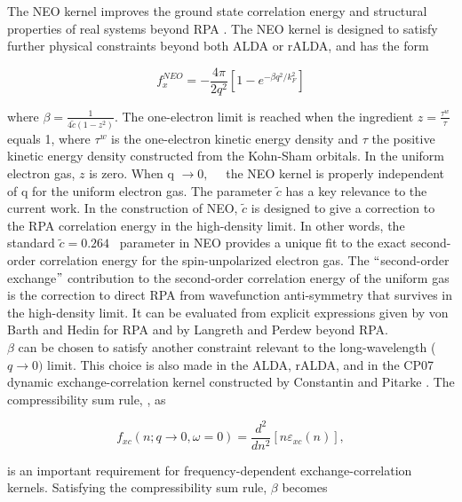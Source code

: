 \documentclass[aps,amsmath,amssymb, preprint, 12pt]{revtex4-1}
\begin{document}
The NEO kernel improves the ground state correlation energy and structural properties of real systems beyond RPA \cite{BLR16}. The NEO kernel is designed to satisfy further physical constraints beyond both ALDA or rALDA, and has the form

\begin{equation}
f_{x}^{NEO}=-\frac{4 \pi }{2q^{2}} [ 1-e^{- \beta q^{2}/k_{F}^{2}} ]
\end{equation}

where  \(  \beta =\frac{1}{4\widetilde{c} \left( 1-z^{2} \right) }. \)   The one-electron limit is reached when the ingredient  \( z=\frac{ \tau^{w}}{ \tau} \) equals 1, where  \(  \tau^{w} \)  is the one-electron kinetic energy density \cite{W35} and  \(  \tau \)  the positive kinetic energy density constructed from the Kohn-Sham orbitals. In the uniform electron gas,  \( z \)  is zero. When q \(  \rightarrow 0, \) \ \  the NEO kernel is properly independent of q for the uniform electron gas. The parameter  \( \widetilde{c} \)  has a key relevance to the current work. In the construction of NEO,  \( \widetilde{c} \)  is designed to give a correction to the RPA correlation energy in the high-density limit. In other words, the standard  \( \widetilde{c}=0.264 \) \ parameter in NEO provides a unique fit to the exact second-order correlation energy for the spin-unpolarized electron gas.  The $``$second-order exchange$"$  contribution to the second-order correlation energy of the uniform gas is the correction to direct RPA from wavefunction anti-symmetry that survives in the high-density limit. It can be evaluated from explicit expressions given by von Barth and Hedin for RPA \cite{VH72} and by Langreth and Perdew \cite{LP75}  beyond RPA.\\

 \noindent \(  \beta  \)  can be chosen to satisfy another constraint relevant to the long-wavelength ( \( q \rightarrow 0 )  \)  limit. This choice is also made in the ALDA, rALDA, and in the CP07 dynamic exchange-correlation kernel constructed by Constantin and Pitarke \cite{CP07}. The compressibility sum rule, \cite{I82}, as

\begin{equation}
f_{xc} ( n;q \rightarrow 0,  \omega =0 ) =\frac{d^{2}}{dn^{2}} [ n \varepsilon _{xc} ( n )  ] ,
\end{equation}

\noindent is an important requirement for frequency-dependent exchange-correlation kernels. Satisfying the compressibility sum rule,  \(  \beta  \)  becomes
\end{document}
